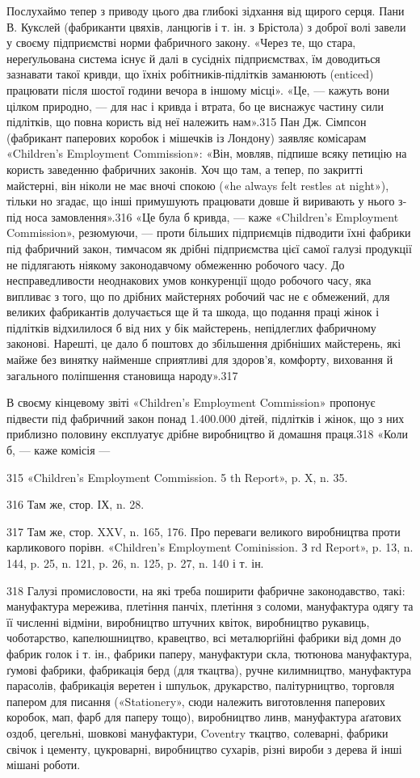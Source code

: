 Послухаймо тепер з приводу цього два глибокі зідхання від щирого серця. Пани В. Кукслей (фабриканти
цвяхів, ланцюгів і т. ін. з Брістола) з доброї волі завели у своєму підприємстві норми фабричного
закону. «Через те, що стара, нереґульована система існує й далі в сусідніх підприємствах, їм
доводиться зазнавати такої кривди, що їхніх робітників-підлітків заманюють (enticed) працювати після
шостої години вечора в іншому місці». «Це, — кажуть вони цілком природно, — для нас і кривда і
втрата, бо це виснажує частину сили підлітків, що повна користь від неї належить нам».315 Пан Дж.
Сімпсон (фабрикант паперових коробок і мішечків із Лондону) заявляє комісарам «Children’s Employment
Commission»: «Він, мовляв, підпише всяку петицію на користь заведенню фабричних законів. Хоч що там,
а тепер, по закритті майстерні, він ніколи не має вночі спокою («he always felt restles at night»),
тільки но згадає, що інші примушують працювати довше й виривають у нього з-під носа замовлення».316
«Це була б кривда, — каже «Children’s Employment Commission», резюмуючи, — проти більших підприємців
підводити їхні фабрики під фабричний закон, тимчасом як дрібні підприємства цієї самої галузі
продукції не підлягають ніякому законодавчому обмеженню робочого часу. До несправедливости
неоднакових умов конкуренції щодо робочого часу, яка випливає з того, що по дрібних майстернях
робочий час не є обмежений, для великих фабрикантів долучається ще й та шкода, що подання праці
жінок і підлітків відхилилося б від них у бік майстерень, непідлеглих фабричному законові. Нарешті,
це дало б поштовх до збільшення дрібніших майстерень, які майже без винятку найменше сприятливі для
здоров’я, комфорту, виховання й загального поліпшення становища народу».317

В своєму кінцевому звіті «Children’s Employment Commission» пропонує підвести під фабричний закон
понад 1.400.000 дітей, підлітків і жінок, що з них приблизно половину експлуатує дрібне виробництво
й домашня праця.318 «Коли б, — каже комісія —

315 «Children's Employment Commission. 5 th Report», p. X, n. 35.

316    Там же, стор. ІХ, n. 28.

317    Там же, стор. XXV, n. 165, 176. Про переваги великого виробництва проти карликового порівн.
«Children’s Employment Cominission. З rd Report», p. 13, n. 144, p. 25, n. 121, p. 26, n. 125, p.
27, n. 140 і т. ін.

318    Галузі промисловости, на які треба поширити фабричне законодавство, такі: мануфактура
мережива, плетіння панчіх, плетіння з соломи, мануфактура одягу та її численні відміни, виробництво
штучних квіток, виробництво рукавиць, чоботарство, капелюшництво, кравецтво, всі металюрґійні
фабрики від домн до фабрик голок і т. ін., фабрики паперу, мануфактури скла, тютюнова мануфактура,
ґумові фабрики, фабрикація берд (для ткацтва), ручне килимництво, мануфактура парасолів, фабрикація
веретен і шпульок, друкарство, палітурництво, торговля папером для писання («Stationery», сюди
належить виготовлення паперових коробок, мап, фарб для паперу тощо), виробництво линв, мануфактура
аґатових оздоб, цегельні, шовкові мануфактури, Coventry ткацтво, солеварні, фабрики свічок і
цементу, цукроварні, виробництво сухарів, різні вироби з дерева й інші мішані роботи.
